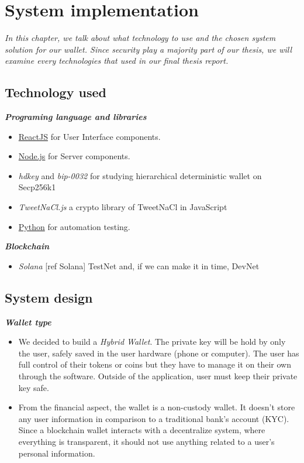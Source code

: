 \chapter{System implementation} \label{chap:System_implementation}
\textit{In this chapter, we talk about what technology to use and the chosen system solution for our wallet. Since security play a majority part of our thesis, we will examine every technologies that used in our final thesis report.}
\minitoc

\section{Technology used}
{\textit {\textbf{Programing language and libraries}}}
\begin{itemize}
\item \href{https://reactjs.org/}{ReactJS} for User Interface components. 
\item \href{https://nodejs.org/en/}{Node.js} for Server components.
\item \emph{hdkey} and \emph{bip-0032} for studying hierarchical deterministic wallet on Secp256k1
\item \emph{TweetNaCl.js} a crypto library of TweetNaCl in JavaScript
\item \href{https://www.python.org/}{Python} for automation testing.
\end{itemize}

{\textit {\textbf{Blockchain}}}
\begin{itemize}
    \item \emph{Solana} [ref Solana] TestNet and, if we can make it in time, DevNet
\end{itemize}

\section{System design}
{\textit {\textbf{Wallet type}}}
\begin{itemize}
    \item We decided to build a \emph{Hybrid Wallet}. The private key will be hold by only the user, safely saved in the user hardware (phone or computer). The user has full control of their tokens or coins but they have to manage it on their own through the software. Outside of the application, user must keep their private key safe.
    \item From the financial aspect, the wallet is a non-custody wallet. It doesn't store any user information in comparison to a traditional bank's account (KYC). Since a blockchain wallet interacts with a decentralize system, where everything is transparent, it should not use anything related to a user's personal information.
\end{itemize}

